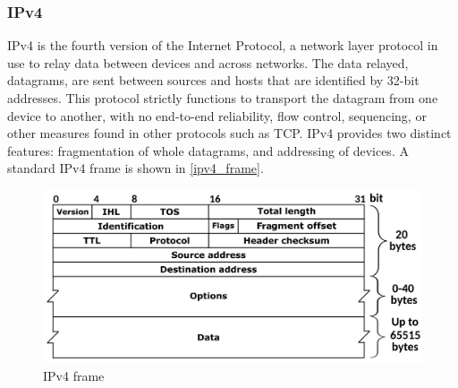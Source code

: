\subsubsection{IPv4} IPv4 is the fourth version of the Internet Protocol, a network layer protocol in use to relay data between devices and across networks. The data relayed, datagrams, are sent between sources and hosts that are identified by 32-bit addresses. This protocol strictly functions to transport the datagram from one device to another, with no end-to-end reliability, flow control, sequencing, or other measures found in other protocols such as TCP. IPv4 provides two distinct features: fragmentation of whole datagrams, and addressing of devices. A standard IPv4 frame is shown in \autoref{ipv4_frame}.
\begin{figure}[H]
    \caption{IPv4 frame \cite{Postel1981}}
    \label{ipv4_frame}
    \centering
    \includegraphics[width=\textwidth]{images/ipv4_frame.png}
\end{figure}

